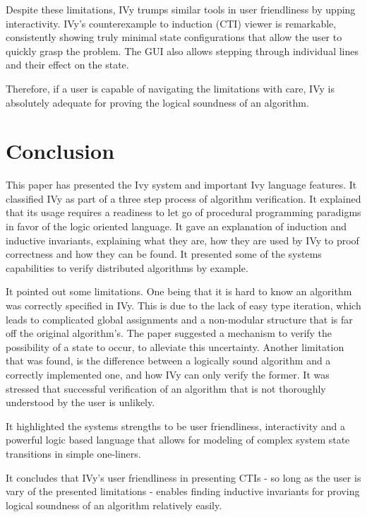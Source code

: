 \documentclass[fleqn]{article}
\begin{document}
Despite these limitations, IVy trumps similar tools in user friendliness by upping interactivity. \cite{ivy}
IVy's counterexample to induction (CTI) viewer is remarkable, consistently showing truly minimal
state configurations that allow the user to quickly grasp the problem. The GUI also allows stepping
through individual lines and their effect on the state.

Therefore, if a user is capable of navigating the limitations with care, IVy is absolutely adequate for proving the logical soundness of
an algorithm.


\section{Conclusion}
This paper has presented the Ivy system and important Ivy language features. It classified IVy
as part of a three step process of algorithm verification.
It explained that its usage requires a readiness to let go of procedural programming paradigms
in favor of the logic oriented language. It gave an explanation of induction and inductive invariants,
explaining what they are, how they are used by IVy to proof correctness and how they can be found.
It presented some of the systems capabilities to verify distributed algorithms by example.

It pointed out some limitations. One being that it is hard to know an algorithm was correctly specified in IVy. This is due to
the lack of easy type iteration, which leads to complicated global assignments and a non-modular structure that is far off
the original algorithm's.
The paper suggested a mechanism to verify the possibility of a state to occur, to alleviate this uncertainty.
Another limitation that was found, is the difference between a logically sound algorithm and a correctly implemented one, and how IVy can only verify the former.
It was stressed that successful verification of an algorithm that is not thoroughly understood by the user is unlikely.

It highlighted the systems strengths to be user friendliness, interactivity and a powerful logic based language that allows for
modeling of complex system state transitions in simple one-liners.

It concludes that IVy's user friendliness in presenting CTIs - so long as the user is vary of the presented limitations - enables
finding inductive invariants for proving logical soundness of an algorithm relatively easily.
\end{document}
